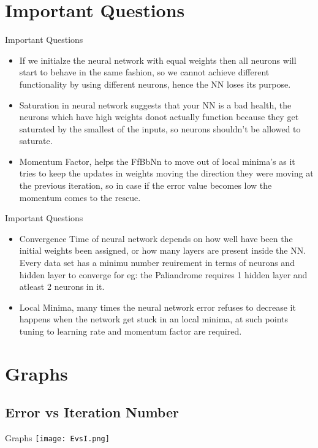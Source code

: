 \documentclass{beamer}
\begin{document}
\section{Important Questions}
\begin{frame}[fragile]{Important Questions}
	\begin{itemize}
    	\item If we initialze the neural network with equal weights then all neurons will start to behave in the same fashion, so we cannot achieve different functionality by using different neurons, hence the NN loses its purpose.
        \item Saturation in neural network suggests that your NN is a bad health, the neurons which have high weights donot actually function because they get saturated by the smallest of the inputs, so neurons shouldn't be allowed to saturate.
        \item Momentum Factor, helps the FfBbNn to move out of local minima's as it tries to keep the updates in weights moving the direction they were moving at the previous iteration, so in case if the error value becomes low the momentum comes to the rescue.
       \end{itemize}
\end{frame}
\begin{frame}[fragile]{Important Questions}
	\begin{itemize}
        \item Convergence Time of neural network depends on how well have been the initial weights been assigned, or how many layers are present inside the NN. Every data set has a minimu number reuirement in terms of neurons and hidden layer to converge for eg: the Paliandrome requires 1 hidden layer and atleast 2 neurons in it.
        \item Local Minima, many times the neural network error refuses to decrease it happens when the network get stuck in an local minima, at such points tuning to learning rate and momentum factor are required.
    \end{itemize}
\end{frame} 

\section{Graphs}

\subsection{Error vs Iteration Number}
\begin{frame}[fragile]{Graphs}
    	\texttt{[image: EvsI.png]}
\end{frame}
\end{document}
